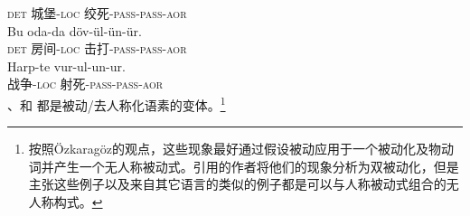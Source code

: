      \textsc{det} 城堡-\textsc{loc} 绞死-\textsc{pass}-\textsc{pass}-\textsc{aor}\\
\ex\label{ex-double-passivization-hit}
\gll Bu oda-da döv-ül-ün-ür.\\
     \textsc{det} 房间-\textsc{loc} 击打-\textsc{pass}-\textsc{pass}-\textsc{aor}\\
\ex
\gll Harp-te vur-ul-un-ur.\\
     战争-\textsc{loc} 射死-\textsc{pass}-\textsc{pass}-\textsc{aor}\\
\zl
{}、和 都是被动/去人称化语素的变体。\footnote{按照Özkara\-göz的观点，这些现象最好通过假设被动应用于一个被动化及物动词并产生一个无人称被动式。引用的作者将他们的现象分析为双被动化，但是 \citet{Blevins2003a}主张这些例子以及来自其它语言的类似的例子都是可以与人称被动式组合的无人称构式。}

